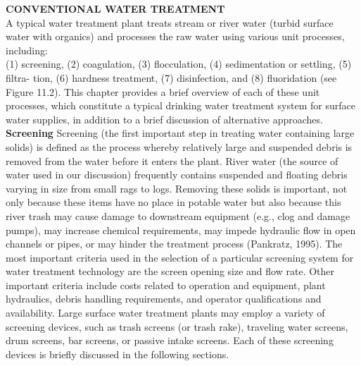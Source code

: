 \documentclass{article}
\begin{document}
\textbf{CONVENTIONAL WATER TREATMENT}\\
A typical water treatment plant treats stream or river water (turbid surface water with organics) and processes the raw water using various unit processes, including:\\
(1) screening, (2) coagulation, (3) flocculation, (4) sedimentation or settling, (5) filtra-
tion, (6) hardness treatment, (7) disinfection, and (8) fluoridation (see Figure 11.2). This chapter provides a brief overview of each of these unit processes, which constitute a typical drinking water treatment system for surface water supplies, in addition to a brief discussion of alternative approaches.\\

\textbf{Screening}
Screening (the first important step in treating water containing large solids) is defined as the process whereby relatively large and suspended debris is removed from the water before it enters the plant. River water (the source of water used in our discussion) frequently contains suspended and floating debris varying in size from small rags to logs. Removing these solids is important, not only because these items have no place in potable water but also because this river trash may cause damage to downstream equipment (e.g., clog and damage pumps), may increase chemical requirements, may impede hydraulic flow in open channels or pipes, or may hinder the treatment process (Pankratz, 1995). The most important criteria used in the selection of a particular screening system for water treatment technology are the screen opening size and flow rate. Other important criteria include costs related to operation and equipment, plant hydraulics, debris handling requirements, and operator qualifications and availability. Large surface water treatment plants may employ a variety of screening devices, such as trash screens (or trash rake), traveling water screens, drum screens, bar screens, or passive intake screens. Each of these screening devices is briefly discussed in the following sections.\\
 
\end{document}
